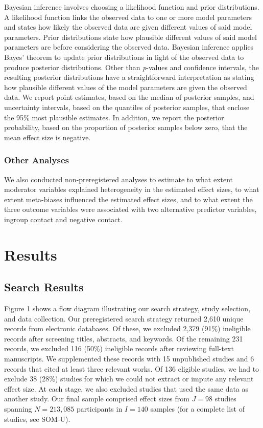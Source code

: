 \documentclass[12pt, letterpaper]{article}
\begin{document}
Bayesian inference involves choosing a likelihood function and prior
distributions. A likelihood function links the observed data to one or
more model parameters and states how likely the observed data are given
different values of said model parameters. Prior distributions state how
plausible different values of said model parameters are before
considering the observed data. Bayesian inference applies Bayes' theorem
to update prior distributions in light of the observed data to produce
posterior distributions. Other than \emph{p}-values and confidence
intervals, the resulting posterior distributions have a straightforward
interpretation as stating how plausible different values of the model
parameters are given the observed data. We report point estimates, based
on the median of posterior samples, and uncertainty intervals, based on
the quantiles of posterior samples, that enclose the 95\% most plausible
estimates. In addition, we report the posterior probability, based on
the proportion of posterior samples below zero, that the mean effect
size is negative.

\hypertarget{other-analyses}{%
\subsubsection{Other Analyses}\label{other-analyses}}

We also conducted non-preregistered analyses to estimate to what extent
moderator variables explained heterogeneity in the estimated effect
sizes, to what extent meta-biases influenced the estimated effect sizes,
and to what extent the three outcome variables were associated with two
alternative predictor variables, ingroup contact and negative contact.

\hypertarget{results}{%
\section{Results}\label{results}}

\hypertarget{search-results}{%
\subsection{Search Results}\label{search-results}}

Figure 1 shows a flow diagram illustrating our search strategy, study
selection, and data collection. Our preregistered search strategy
returned 2,610 unique records from electronic databases. Of these, we
excluded 2,379 (91\%) ineligible records after screening titles,
abstracts, and keywords. Of the remaining 231 records, we excluded 116
(50\%) ineligible records after reviewing full-text manuscripts. We
supplemented these records with 15 unpublished studies and 6 records
that cited at least three relevant works. Of 136 eligible studies, we
had to exclude 38 (28\%) studies for which we could not extract or
impute any relevant effect size. At each stage, we also excluded studies
that used the same data as another study. Our final sample comprised
effect sizes from \(J = 98\) studies spanning \(N = 213,085\)
participants in \(I = 140\) samples (for a complete list of studies, see
SOM-U).
\end{document}
